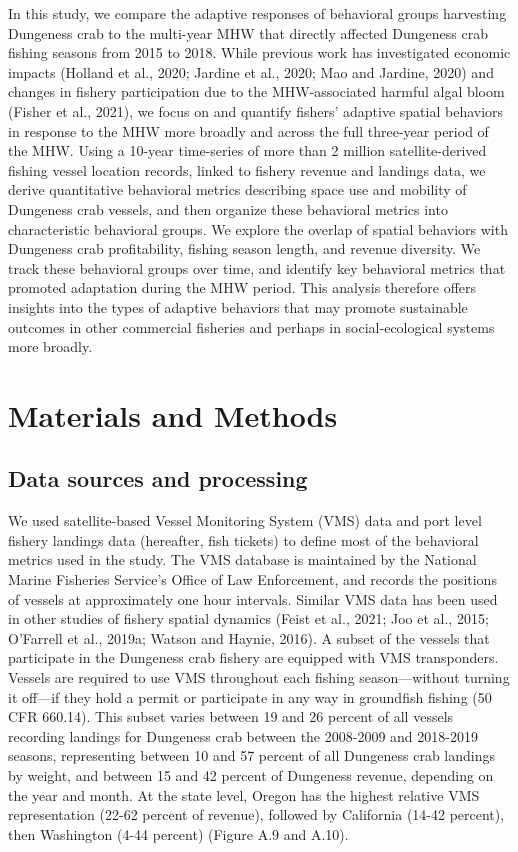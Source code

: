 \documentclass[]{elsarticle} %
\begin{document}
In this study, we compare the adaptive responses of behavioral groups
harvesting Dungeness crab to the multi-year MHW that directly affected
Dungeness crab fishing seasons from 2015 to 2018. While previous work
has investigated economic impacts (Holland et al., 2020; Jardine et al.,
2020; Mao and Jardine, 2020) and changes in fishery participation due to
the MHW-associated harmful algal bloom (Fisher et al., 2021), we focus
on and quantify fishers' adaptive spatial behaviors in response to the
MHW more broadly and across the full three-year period of the MHW. Using
a 10-year time-series of more than 2 million satellite-derived fishing
vessel location records, linked to fishery revenue and landings data, we
derive quantitative behavioral metrics describing space use and mobility
of Dungeness crab vessels, and then organize these behavioral metrics
into characteristic behavioral groups. We explore the overlap of spatial
behaviors with Dungeness crab profitability, fishing season length, and
revenue diversity. We track these behavioral groups over time, and
identify key behavioral metrics that promoted adaptation during the MHW
period. This analysis therefore offers insights into the types of
adaptive behaviors that may promote sustainable outcomes in other
commercial fisheries and perhaps in social-ecological systems more
broadly.

\hypertarget{methods}{%
\section{Materials and Methods}\label{methods}}

\hypertarget{data-sources-and-processing}{%
\subsection{Data sources and
processing}\label{data-sources-and-processing}}

We used satellite-based Vessel Monitoring System (VMS) data and port
level fishery landings data (hereafter, fish tickets) to define most of
the behavioral metrics used in the study. The VMS database is maintained
by the National Marine Fisheries Service's Office of Law Enforcement,
and records the positions of vessels at approximately one hour
intervals. Similar VMS data has been used in other studies of fishery
spatial dynamics (Feist et al., 2021; Joo et al., 2015; O'Farrell et
al., 2019a; Watson and Haynie, 2016). A subset of the vessels that
participate in the Dungeness crab fishery are equipped with VMS
transponders. Vessels are required to use VMS throughout each fishing
season---without turning it off---if they hold a permit or participate
in any way in groundfish fishing (50 CFR 660.14). This subset varies
between 19 and 26 percent of all vessels recording landings for
Dungeness crab between the 2008-2009 and 2018-2019 seasons, representing
between 10 and 57 percent of all Dungeness crab landings by weight, and
between 15 and 42 percent of Dungeness revenue, depending on the year
and month. At the state level, Oregon has the highest relative VMS
representation (22-62 percent of revenue), followed by California (14-42
percent), then Washington (4-44 percent) (Figure A.9 and A.10).
\end{document}
